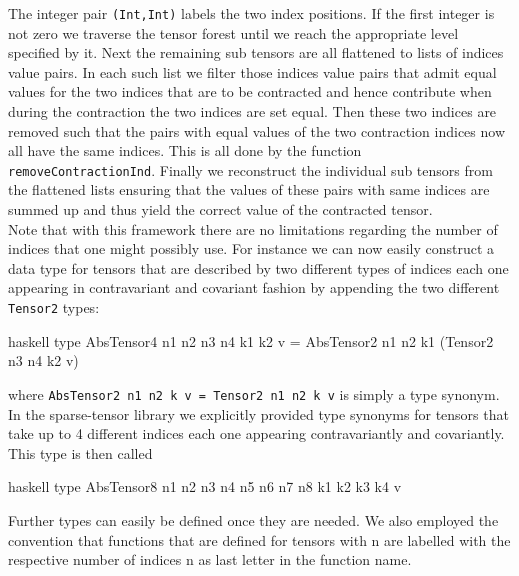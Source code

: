 \documentclass[a4paper,12pt, DIV=14, BCOR=5mm, twoside, headsepline]{scrbook}
\begin{document}
The integer pair \texttt{(Int,Int)} labels the two index positions. If the first integer is not zero we traverse the tensor forest until we reach the appropriate level specified by it. Next the remaining sub tensors are all flattened to lists of indices value pairs. In each such list we filter those indices value pairs that admit equal values for the two indices that are to be contracted and hence contribute when during the contraction the two indices are set equal. Then these two indices are removed such that the pairs with equal values of the two contraction indices now all have the same indices. This is all done by the function \texttt{removeContractionInd}. Finally we reconstruct the individual sub tensors from the flattened lists ensuring that the values of these pairs with same indices are summed up and thus yield the correct value of the contracted tensor. \\

Note that with this framework there are no limitations regarding the number of indices that one might possibly use. For instance we can now easily construct a data type for tensors that are described by two different types of indices each one appearing in contravariant and covariant fashion by appending the two different \texttt{Tensor2} types:
\begin{center}
\begin{cminted}{haskell}
type AbsTensor4 n1 n2 n3 n4 k1 k2 v = AbsTensor2 n1 n2 k1 
                                     (Tensor2 n3 n4 k2 v)
\end{cminted}
\end{center}
where \texttt{AbsTensor2 n1 n2 k v = Tensor2 n1 n2 k v} is simply a type synonym. In the sparse-tensor library  we explicitly provided type synonyms for tensors that take up to 4 different indices each one appearing contravariantly and covariantly. This type is then called 
\begin{center}
\begin{cminted}{haskell}
type AbsTensor8 n1 n2 n3 n4 n5 n6 n7 n8 k1 k2 k3 k4 v
\end{cminted}
\end{center}
Further types can easily be defined once they are needed.
We also employed the convention that functions that are defined for tensors with n are labelled with the respective number of indices n as last letter in the function name.
\end{document}
